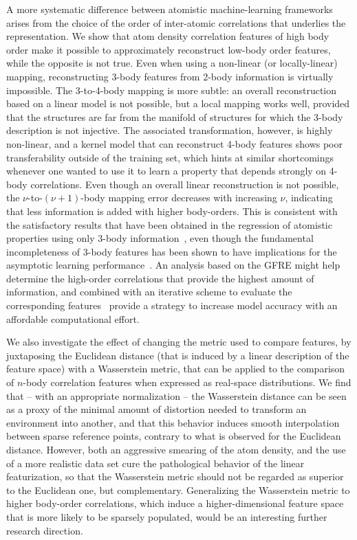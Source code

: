 A more systematic difference between atomistic machine-learning frameworks arises from the choice of the order of inter-atomic correlations that underlies the representation. 
We show that atom density correlation features of high body order make it possible to approximately reconstruct low-body order features, while the opposite is not true. Even when using a non-linear (or locally-linear) mapping, reconstructing 3-body features from 2-body information is virtually impossible.
The 3-to-4-body mapping is more subtle: an overall reconstruction based on a linear model is not possible, but a local mapping works well, provided that the structures are far from the manifold of structures for which the 3-body description is not injective.
The associated transformation, however, is highly non-linear, and a kernel model that can reconstruct 4-body features shows poor transferability outside of the training set, which hints at similar shortcomings whenever one wanted to use it to learn a property that depends strongly on 4-body correlations. 
Even though an overall linear reconstruction is not possible, the $\nu$-to-$(\nu+1)$-body mapping error decreases with increasing $\nu$, indicating that less information is added with higher body-orders.  
This is consistent with the satisfactory results that have been obtained in the regression of atomistic properties using only 3-body information~\cite{glie+18prb, paru+18ncomm}, even though the fundamental incompleteness of 3-body features has been shown to have implications for the asymptotic learning performance~\cite{pozd+20prl}. 
An analysis based on the GFRE might help determine the high-order correlations that provide the highest amount of information, and combined with an iterative scheme to evaluate the corresponding features~\cite{niga+20jcp} provide a strategy to increase model accuracy with an affordable computational effort.

We also investigate the effect of changing the metric used to compare features, by juxtaposing the Euclidean distance (that is induced by a linear description of the feature space) with a Wasserstein metric, that can be applied to the comparison of $n$-body correlation features when expressed as real-space distributions. We find that -- with an appropriate normalization -- the Wasserstein distance can be seen as a proxy of the minimal amount of distortion needed to transform an environment into another, and that this behavior induces smooth interpolation between sparse reference points, contrary to what is observed for the Euclidean distance. 
However, both an aggressive smearing of the atom density, and the use of a more realistic data set cure the pathological behavior of the linear featurization, so that the Wasserstein metric should not be regarded as superior to the Euclidean one, but complementary. Generalizing the Wasserstein metric to higher body-order correlations, which induce a higher-dimensional feature space that is more likely to be sparsely populated, would be an interesting further research direction.

